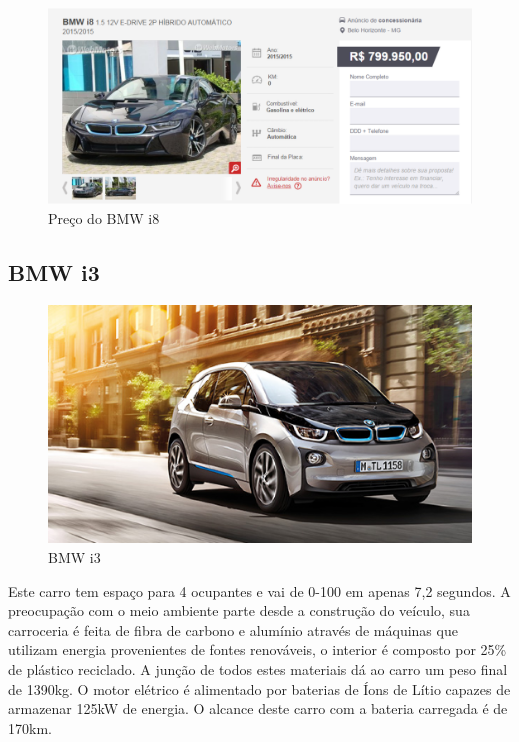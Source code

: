 \begin{figure}[H]
\begin{center}
\includegraphics[keepaspectratio,scale=0.4]{figuras/bmwi8preco.eps}
\caption{Preço do BMW i8}
\end{center}
\end{figure}

\subsection{BMW i3}

\begin{figure}[H]
\begin{center}
\includegraphics[keepaspectratio,scale=0.5]{figuras/i3.jpg.eps}
\caption{BMW i3}
\end{center}
\end{figure}

Este carro tem espaço para 4 ocupantes e vai de 0-100\nicefrac{\si{\kilo\meter}}{\si{\hour}} em apenas 7,2 segundos. A preocupação com o meio ambiente parte desde a construção do veículo, sua carroceria é feita de fibra de carbono e alumínio através de máquinas que utilizam energia provenientes de fontes renováveis, o interior é composto por 25\% de plástico reciclado. A junção de todos estes materiais dá ao carro um peso final de 1390\si{\kilo\gram}. O motor elétrico é alimentado por baterias de Íons de Lítio capazes de armazenar 125\si{\kilo\watt} de energia. O alcance deste carro com a bateria carregada é de 170\si{\kilo\meter}.

